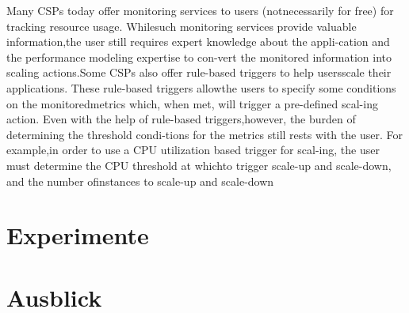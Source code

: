 \documentclass[runningheads]{llncs}
\begin{document}
Many CSPs today offer monitoring services to users (notnecessarily for free) for tracking resource usage. Whilesuch monitoring services provide valuable information,the user still requires expert knowledge about the appli-cation and the performance modeling expertise to con-vert the monitored information into scaling actions.Some CSPs also offer rule-based triggers to help usersscale their applications. These rule-based triggers allowthe users to specify some conditions on the monitoredmetrics which, when met, will trigger a pre-defined scal-ing action.  Even with the help of rule-based triggers,however, the burden of determining the threshold condi-tions for the metrics still rests with the user. For example,in order to use a CPU utilization based trigger for scal-ing, the user must determine the CPU threshold at whichto trigger scale-up and scale-down, and the number ofinstances to scale-up and scale-down


\section{Experimente}
	
	
\section{Ausblick}
	
%
%
\newpage


%
\end{document}
